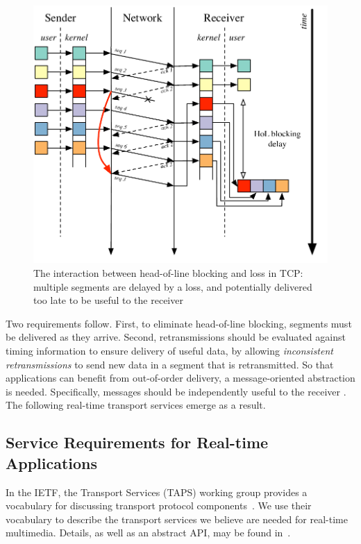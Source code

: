 \begin{figure}[t]
 \centering
 \includegraphics[scale=0.6]{figures/hol-blocking-delay.pdf}
 \caption{The interaction between head-of-line blocking and loss in TCP:
  multiple segments are delayed by a loss, and potentially delivered too late to be useful to the receiver}
\label{diagram:motivation_latency}
\end{figure}

Two requirements follow. First, to eliminate head-of-line blocking,
segments must be delivered as they arrive.  Second, retransmissions should be evaluated
against timing information to ensure delivery of useful data, by allowing
\emph{inconsistent retransmissions} to send new data in a segment that is
retransmitted. So that applications can benefit from out-of-order delivery, a
message-oriented abstraction is needed. Specifically, messages should be
independently useful to the receiver \cite{clark:1990:architecture}. The
following real-time transport services emerge as a result.




\subsection{Service Requirements for Real-time Applications}

In the IETF, the Transport Services (TAPS) working group provides a vocabulary
for discussing transport protocol components~\cite{taps}. We use their
vocabulary to describe the transport services we believe are needed for
real-time multimedia. Details, as well as an abstract API, may be
found in~\cite{McQuistinANRW:2016}.

